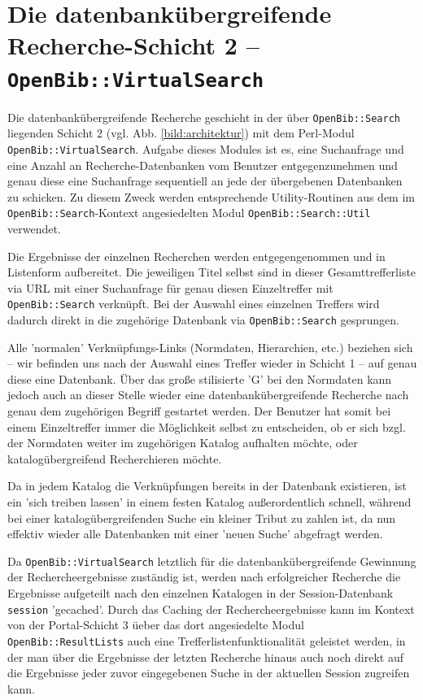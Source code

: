 \documentclass[11pt, twoside, a4paper, BCOR8mm, DIV12, bibtotoc,idxtotoc]{scrbook}
\begin{document}
\section{Die datenbankübergreifende Recherche-Schicht 2 -- \texttt{OpenBib::VirtualSearch}}

Die datenbankübergreifende Recherche geschieht in der über
\texttt{OpenBib::Search} liegenden Schicht 2 (vgl. Abb.
\ref{bild:architektur}) mit dem Perl-Modul
\texttt{OpenBib::VirtualSearch}. Aufgabe dieses Modules ist es, eine
Suchanfrage und eine Anzahl an Recherche-Datenbanken vom Benutzer
entgegen\-zuneh\-men und genau diese eine Suchanfrage sequentiell an
jede der übergebenen Datenbanken zu schicken. Zu diesem Zweck werden
entsprechende Utility-Routinen aus dem im
\texttt{OpenBib::Search}-Kontext angesiedelten Modul
\texttt{OpenBib::Search::Util} verwendet.

Die Ergebnisse der einzelnen Recherchen werden entgegengenommen und in
Listenform auf\-be\-rei\-tet. Die jeweiligen Titel selbst sind in dieser
Gesamttrefferliste via URL mit einer Suchanfrage für genau diesen
Einzeltreffer mit \texttt{OpenBib::Search} verknüpft. 
Bei der
Auswahl eines einzelnen Treffers wird dadurch direkt in die
zugehörige Datenbank via \texttt{OpenBib::Search} gesprungen. 

Alle 'normalen' Verknüpfungs-Links (Normdaten, Hierarchien, etc.)
beziehen sich -- wir befinden uns nach der Auswahl eines Treffer wieder in
Schicht 1 -- auf genau diese eine Datenbank. Über das große
stilisierte 'G' bei den Normdaten kann jedoch auch an dieser Stelle
wieder eine datenbankübergreifende Recherche nach genau dem
zugehörigen Begriff gestartet werden. Der Benutzer hat somit bei
einem Einzeltreffer immer die Möglichkeit selbst zu entscheiden, ob
er sich bzgl. der Normdaten weiter im zugehörigen Katalog aufhalten
möchte, oder katalogübergreifend Recherchieren möchte.

Da in jedem Katalog die Verknüpfungen bereits in der Datenbank
existieren, ist ein 'sich treiben lassen' in einem festen Katalog
außer\-ordentlich schnell, während bei einer katalogübergreifenden
Suche ein kleiner Tribut zu zahlen ist, da nun effektiv wieder alle
Datenbanken mit einer 'neuen Suche' abgefragt werden.

Da \texttt{OpenBib::VirtualSearch} letztlich für die
datenbankübergreifende Gewinnung der Recherche\-er\-geb\-nisse
zuständig ist, werden nach erfolgreicher Recherche die Ergebnisse
aufgeteilt nach den einzelnen Katalogen in der Session-Datenbank
\texttt{session} 'gecached'. Durch das Caching der
Re\-cher\-che\-ergebnisse kann im Kontext von der Portal-Schicht 3
üeber das dort angesiedelte Modul \texttt{OpenBib::ResultLists} auch
eine Trefferlistenfunktionalität geleistet werden, in der man über
die Ergebnisse der letzten Recherche hinaus auch noch direkt auf die
Ergebnisse jeder zuvor eingegebenen Suche in der aktuellen Session
zugreifen kann.
\end{document}
